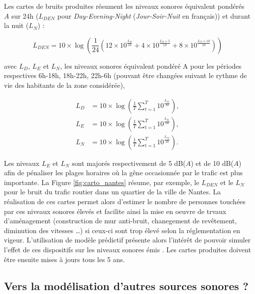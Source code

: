 Les cartes de bruits produites résument les niveaux sonores équivalent pondérés $A$ sur 24h ($L_{DEN}$ pour \textit{Day-Evening-Night} (\textit{Jour-Soir-Nuit} en français)) et durant la nuit ($L_N$) :

\begin{equation}
L_{DEN} = 10\times\log \left(\frac{1}{24} \left(12\times10^{\frac{L_D}{10}}+4\times10^{\frac{L_E+5}{10}}+8\times10^{\frac{L_N+10}{10}} \right)\right)
\end{equation}

avec $L_D$, $L_E$ et $L_N$, les niveaux sonores équivalent pondéré A pour les périodes respectives 6h-18h, 18h-22h, 22h-6h (pouvant être changées suivant le rythme de vie des habitants de la zone considérée),

\begin{subequations}
\begin{align}
L_D &= 10\times\log\left(\frac{1}{T} \sum_{t = 1}^{T}10^{\frac{L_{D_t}}{10}}\right),\\
L_E &= 10\times\log\left(\frac{1}{T} \sum_{t = 1}^{T}10^{\frac{L_{E_t}}{10}}\right),\\
L_N &= 10\times\log\left(\frac{1}{T} \sum_{t = 1}^{T}10^{\frac{L_{N_t}}{10}}\right).
\end{align}
\end{subequations}

Les niveaux $L_E$ et $L_N$ sont majorés respectivement de 5 dB($A$) et de 10 dB($A$) afin de pénaliser les plages horaires où la gêne occasionnée par le trafic est plus importante. La Figure \ref{fig:carto_nantes} résume, par exemple, le $L_{DEN}$ et le $L_N$ pour le bruit du trafic routier dans un quartier de la ville de Nantes.
La réalisation de ces cartes permet alors d'estimer le nombre  de personnes touchées par ces niveaux sonores élevés et facilite ainsi la mise en oeuvre de trvaux d'aménagement (construction de mur anti-bruit, chanegement de revêtement, diminution des vitesses \dots) si ceux-ci sont trop élevé selon la réglementation en vigeur. L'utilisation de modèle prédictif présente alors l'intérêt de pouvoir simuler l'effet de ces dispositifs sur les niveaux sonores émis \cite{murphy2011scenario,guedes2011influence}. Les cartes produites doivent être ensuite mises à jours tous les 5 ans.


\subsection{Vers la modélisation d'autres sources sonores ?}

